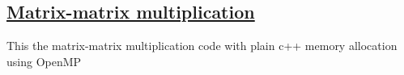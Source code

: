 \documentclass[%
oneside,                 %
final,                   %
10pt]{article}
\begin{document}
\subsection*{\href{{https://github.com/CompPhysics/ComputationalPhysicsMSU/blob/master/doc/Programs/ParallelizationOpenMP/OpenMPmatrixmatrixmult.cpp}}{Matrix-matrix multiplication}}
This the matrix-matrix multiplication code with plain c++ memory allocation using OpenMP
\end{document}
